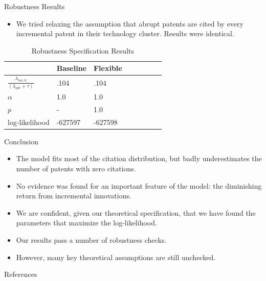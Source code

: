 \documentclass[11pt]{beamer}
\begin{document}
\begin{frame}{Robustness Results}
	\begin{itemize} \itemsep 12pt
		\item We tried relaxing the assumption that abrupt patents are cited by every incremental patent in their technology cluster. Results were identical.
	\end{itemize}
	\begin{table}
		\caption*{Robustness Specification Results}
		\centering
		\begin{tabular}{l llp{1.5cm} p{0.5cm} llp{1.5cm}}
			\toprule
			    & \multicolumn{1}{c}{Baseline} & \multicolumn{1}{c}{Flexible}\\ 
			\midrule
			$\frac{\lambda_{inc, 0}}{(\lambda_{abr} + \tau)}$ & .104 & .104 \\
			$\alpha$ & 1.0 & 1.0\\
			$p$ & - & 1.0 \\
			log-likelihood & -627597 & -627598 \\
			\bottomrule
		\end{tabular}
	\end{table}
\end{frame}

\begin{frame}{Conclusion}
\begin{itemize}\itemsep12pt	
		\item The model fits most of the citation distribution, but badly underestimates the number of  patents with zero citations.
		\item No evidence was found for an important feature of the model: the diminishing return from incremental innovations.
		\item We are confident, given our theoretical specification, that we have found the parameters that maximize the log-likelihood.
		\item Our results pass a number of robustness checks.
		\item However, many key theoretical assumptions are still unchecked.
	\end{itemize}
\end{frame}

\begin{frame}{References}
	\nocite{*}
	
\end{frame}
\end{document}
